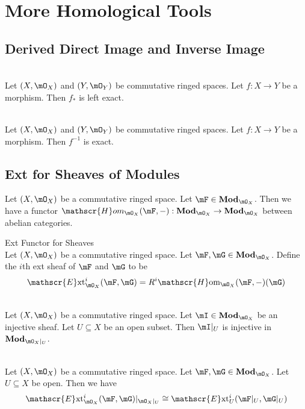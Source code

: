 \documentclass[a4paper]{article}
\begin{document}
\pagebreak
\section{More Homological Tools}
\subsection{Derived Direct Image and Inverse Image}
\begin{prp}{}{}\\
Let $(X,\mO_X)$ and $(Y,\mO_Y)$ be commutative ringed spaces. Let $f:X\to Y$ be a morphism. Then $f_\ast$ is left exact. 
\end{prp}

\begin{prp}{}{}\\
Let $(X,\mO_X)$ and $(Y,\mO_Y)$ be commutative ringed spaces. Let $f:X\to Y$ be a morphism. Then $f^{-1}$ is exact. 
\end{prp}

\subsection{Ext for Sheaves of Modules}
Let $(X,\mO_X)$ be a commutative ringed space. Let $\mF\in\bold{Mod}_{\mO_X}$. Then we have a functor $\mathscr{H}om_{\mO_X}(\mF,-):\bold{Mod}_{\mO_X}\to\bold{Mod}_{\mO_X}$ between abelian categories. 

\begin{defn}{Ext Functor for Sheaves}{}\\
Let $(X,\mO_X)$ be a commutative ringed space. Let $\mF,\mG\in\bold{Mod}_{\mO_X}$. Define the $i$th ext sheaf of $\mF$ and $\mG$ to be $$\mathscr{E}\text{xt}_{\mO_X}^i(\mF,\mG)=R^i\mathscr{H}\text{om}_{\mO_X}(\mF,-)(\mG)$$
\end{defn}

\begin{lmm}{}{}\\
Let $(X,\mO_X)$ be a commutative ringed space. Let $\mI\in\bold{Mod}_{\mO_X}$ be an injective sheaf. Let $U\subseteq X$ be an open subset. Then $\mI|_U$ is injective in $\bold{Mod}_{\mO_X|_U}$. 
\end{lmm}

\begin{prp}{}{}\\
Let $(X,\mO_X)$ be a commutative ringed space. Let $\mF,\mG\in\bold{Mod}_{\mO_X}$. Let $U\subseteq X$ be open. Then we have $$\mathscr{E}\text{xt}_{\mO_X}^i(\mF,\mG)|_{\mO_X|_U}\cong\mathscr{E}\text{xt}_U^i(\mF|_U,\mG|_U)$$
\end{prp}
\end{document}
